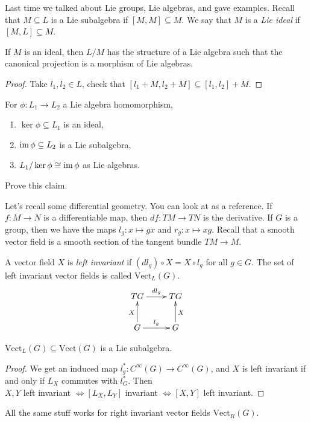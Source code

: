  \setcounter{lecture}{2}

 Last time we talked about Lie groups, Lie algebras, and gave examples. Recall that
 $M\subseteq L$ is a Lie subalgebra if $[M,M]\subseteq M$. We say that $M$ is a
 \emph{Lie ideal} if $[M,L]\subseteq M$.

 \begin{claim}
   If $M$ is an ideal, then $L/M$ has the structure of a Lie algebra such that the
   canonical projection is a morphism of Lie algebras.
 \end{claim}
 \begin{proof}
   Take $l_1,l_2\in L$, check that $[l_1+M,l_2+M]\subseteq [l_1,l_2]+M$.
 \end{proof}

 \begin{claim} For $\phi:L_1\to L_2$ a Lie algebra homomorphism,
   \begin{enumerate}
   \item $\ker \phi \subseteq L_1$ is an ideal,
   \item $\operatorname{im} \phi\subseteq L_2$ is a Lie subalgebra,
   \item $L_1/\ker\phi \cong \operatorname{im}\phi$ as Lie algebras.
   \end{enumerate}
 \end{claim}
 \begin{exercise}
   Prove this claim.
 \end{exercise}

  Let's recall some differential
 geometry. You can look at \cite{Lee:ISM} as a reference. If $f:M\to N$ is a
 differentiable map, then $df:TM\to TN$ is the derivative. If $G$ is a group, then we
 have the maps $l_g:x\mapsto gx$ and $r_g:x\mapsto xg$. Recall that a smooth vector
 field is a smooth section of the tangent bundle $TM\to M$.
 \begin{definition}
   A vector field $X$ is \emph{left invariant} if $(dl_g)\circ X=X\circ l_g$ for all
   $g\in G$. The set of left invariant vector fields is called $\mathrm{Vect}_L(G)$.
   \[\xymatrix{
    TG \ar[r]^{dl_g} & TG\\
    G\ar[u]^X \ar[r]^{l_g} & G\ar[u]_X
   }\]
 \end{definition}

 \begin{proposition}
   $\mathrm{Vect}_L(G)\subseteq \mathrm{Vect}(G)$ is a Lie subalgebra.
 \end{proposition}
 \begin{proof}
   We get an induced map $l_g^*:C^\infty(G)\to C^\infty(G)$, and $X$ is left invariant
   if and only if $L_X$ commutes with $l_G^*$. Then\\
    $X,Y$ left invariant $\Longleftrightarrow [L_X,L_Y]$ invariant $\Longleftrightarrow [X,Y]$
    left invariant.
 \end{proof}
 All the same stuff works for right invariant vector fields $\mathrm{Vect}_R(G)$.

